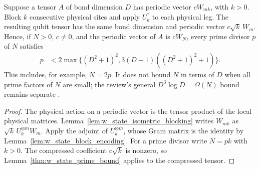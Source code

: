 \begin{lemma}
    \label{lem:w_state_prime_divisor_bound}
    \leanok
    Suppose a tensor $A$ of bond dimension $D$ has periodic vector
    $cW_{mk}$, with $k>0$. Block $k$ consecutive physical sites and apply
    $U_k^\dagger$ to each physical leg. The resulting qubit tensor has the
    same bond dimension and periodic vector $c\sqrt k\,W_m$.
    Hence, if $N>0$, $c\ne0$, and the periodic vector of $A$ is $cW_N$,
    every prime divisor $p$ of $N$ satisfies
    \begin{align}
        p & <2\max\bigl\{(D^2+1)^2,
        3(D-1)((D^2+1)^2+1)\bigr\}.
        \label{eq:w_state_prime_divisor_bound}
    \end{align}
    This includes, for example, $N=2p$. It does not bound $N$ in terms
    of $D$ when all prime factors of $N$ are small; the review's general
    $D^3\log D=\Omega(N)$ bound remains separate
    \cite{gap:rmp_w_state_ti_bound}.
\end{lemma}
\begin{proof}
    \leanok
    The physical action on a periodic vector is the tensor product of the
    local physical matrices. Lemma~\ref{lem:w_state_isometric_blocking}
    writes $W_{mk}$ as $\sqrt k\,U_k^{\otimes m}W_m$. Apply the adjoint of
    $U_k^{\otimes m}$, whose Gram matrix is the identity by
    Lemma~\ref{lem:w_state_block_encoding}.
    For a prime divisor write $N=pk$ with $k>0$. The compressed coefficient
    $c\sqrt k$ is nonzero, so Lemma~\ref{thm:w_state_prime_bound} applies
    to the compressed tensor.
\end{proof}
